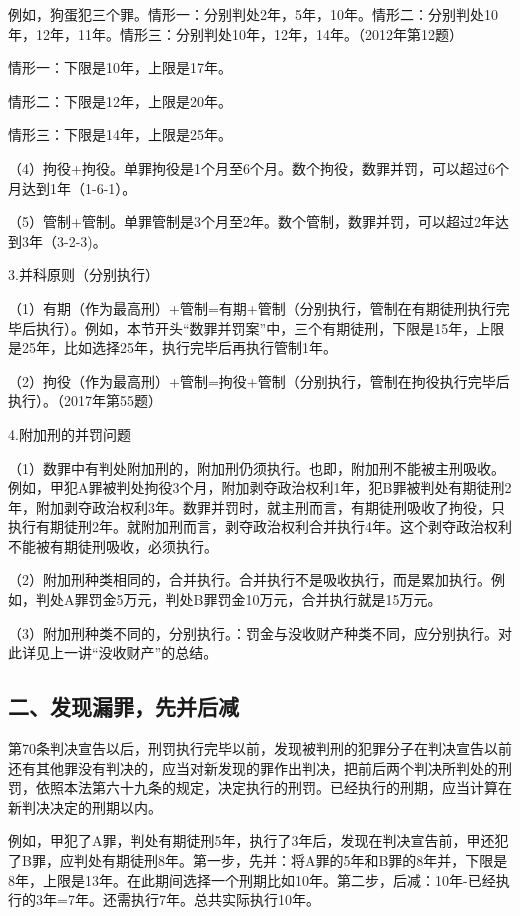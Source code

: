 例如，狗蛋犯三个罪。情形一：分别判处2年，5年，10年。情形二：分别判处10年，12年，11年。情形三：分别判处10年，12年，14年。（2012年第12题）


情形一：下限是10年，上限是17年。

情形二：下限是12年，上限是20年。

情形三：下限是14年，上限是25年。

（4）拘役+拘役。单罪拘役是1个月至6个月。数个拘役，数罪并罚，可以超过6个月达到1年（1-6-1）。

（5）管制+管制。单罪管制是3个月至2年。数个管制，数罪并罚，可以超过2年达到3年（3-2-3)。

3.并科原则（分别执行）

（1）有期（作为最高刑）+管制=有期+管制（分别执行，管制在有期徒刑执行完毕后执行）。例如，本节开头“数罪并罚案”中，三个有期徒刑，下限是15年，上限是25年，比如选择25年，执行完毕后再执行管制1年。

（2）拘役（作为最高刑）+管制=拘役+管制（分别执行，管制在拘役执行完毕后执行）。（2017年第55题）

4.附加刑的并罚问题

（1）数罪中有判处附加刑的，附加刑仍须执行。也即，附加刑不能被主刑吸收。例如，甲犯A罪被判处拘役3个月，附加剥夺政治权利1年，犯B罪被判处有期徒刑2年，附加剥夺政治权利3年。数罪并罚时，就主刑而言，有期徒刑吸收了拘役，只执行有期徒刑2年。就附加刑而言，剥夺政治权利合并执行4年。这个剥夺政治权利不能被有期徒刑吸收，必须执行。

（2）附加刑种类相同的，合并执行。合并执行不是吸收执行，而是累加执行。例如，判处A罪罚金5万元，判处B罪罚金10万元，合并执行就是15万元。

（3）附加刑种类不同的，分别执行。：罚金与没收财产种类不同，应分别执行。对此详见上一讲“没收财产”的总结。

\subsection*{二、发现漏罪，先并后减}

第70条判决宣告以后，刑罚执行完毕以前，发现被判刑的犯罪分子在判决宣告以前还有其他罪没有判决的，应当对新发现的罪作出判决，把前后两个判决所判处的刑罚，依照本法第六十九条的规定，决定执行的刑罚。已经执行的刑期，应当计算在新判决决定的刑期以内。

例如，甲犯了A罪，判处有期徒刑5年，执行了3年后，发现在判决宣告前，甲还犯了B罪，应判处有期徒刑8年。第一步，先并：将A罪的5年和B罪的8年并，下限是8年，上限是13年。在此期间选择一个刑期比如10年。第二步，后减：10年-已经执行的3年=7年。还需执行7年。总共实际执行10年。

